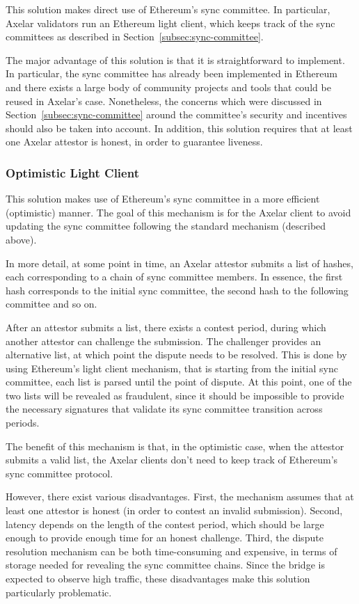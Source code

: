 This solution makes direct use of Ethereum's sync committee. In particular,
Axelar validators run an Ethereum light client, which keeps track of the sync
committees as described in Section~\ref{subsec:sync-committee}.

The major advantage of this solution is that it is straightforward to
implement. In particular, the sync committee has already been implemented in
Ethereum and there exists a large body of community projects and tools that
could be reused in Axelar's case. Nonetheless, the concerns which were
discussed in Section~\ref{subsec:sync-committee} around the committee's
security and incentives should also be taken into account. In addition, this
solution requires that at least one Axelar attestor is honest, in order to
guarantee liveness.

\subsubsection{Optimistic Light Client}

This solution makes use of Ethereum's sync committee in a more efficient
(optimistic) manner. The goal of this mechanism is for the Axelar client to
avoid updating the sync committee following the standard mechanism (described
above).

In more detail, at some point in time, an Axelar attestor submits a list of
hashes, each corresponding to a chain of sync committee members. In essence,
the first hash corresponds to the initial sync committee, the second hash to
the following committee and so on.

After an attestor submits a list, there exists a contest period, during which
another attestor can challenge the submission. The challenger provides an
alternative list, at which point the dispute needs to be resolved. This is done
by using Ethereum's light client mechanism, that is starting from the initial
sync committee, each list is parsed until the point of dispute. At this point,
one of the two lists will be revealed as fraudulent, since it should be
impossible to provide the necessary signatures that validate its sync committee
transition across periods.

The benefit of this mechanism is that, in the optimistic case, when the
attestor submits a valid list, the Axelar clients don't need to keep track of
Ethereum's sync committee protocol.

However, there exist various disadvantages. First, the mechanism assumes that
at least one attestor is honest (in order to contest an invalid submission).
Second, latency depends on the length of the contest period, which should be
large enough to provide enough time for an honest challenge. Third, the dispute
resolution mechanism can be both time-consuming and expensive, in terms of
storage needed for revealing the sync committee chains.
Since the bridge is expected to observe high traffic, these disadvantages make
this solution particularly problematic.

